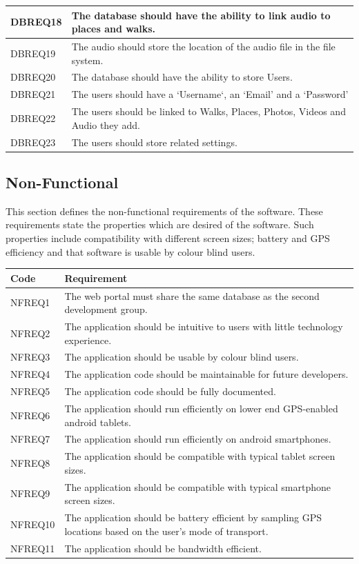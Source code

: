 \documentclass[11pt,a4paper]{article}
\begin{document}
\begin{longtable}{|p{2.5cm}p{13cm}|}
DBREQ18 & The database should have the ability to link audio to places and walks.\\ \hline
DBREQ19 & The audio should store the location of the audio file in the file system.\\ \hline
DBREQ20 & The database should have the ability to store Users. \\ \hline
DBREQ21 & The users should have a `Username`, an `Email' and a `Password'\\ \hline
DBREQ22 & The users should be linked to Walks, Places, Photos, Videos and Audio they add. \\ \hline
DBREQ23 & The users should store related settings. \\ \hline 

\end{longtable}

\subsection{Non-Functional}
\label{sec:non-func-reqs}

This section defines the non-functional requirements of the software.
These requirements state the properties which are desired of the software.
Such properties include compatibility with different screen sizes; battery and GPS efficiency and that software is usable by colour blind users.

\begin{longtable}{|p{2.5cm}p{13cm}|}
\hline
\textbf{Code} & \textbf{Requirement} \\

\hline
NFREQ1 & The web portal must share the same database as the second development group. \\ \hline
NFREQ2 & The application should be intuitive to users with little technology experience. \\ \hline
NFREQ3 & The application should be usable by colour blind users. \\ \hline
NFREQ4 & The application code should be maintainable for future developers. \\ \hline
NFREQ5 & The application code should be fully documented. \\ \hline
NFREQ6 & The application should run efficiently on lower end GPS-enabled android tablets. \\ \hline
NFREQ7 & The application should run efficiently on android smartphones. \\ \hline
NFREQ8 & The application should be compatible with typical tablet screen sizes. \\ \hline
NFREQ9 & The application should be compatible with typical smartphone screen sizes. \\ \hline
NFREQ10 & The application should be battery efficient by sampling GPS locations based on the user's mode of transport. \\ \hline
NFREQ11 & The application should be bandwidth efficient. \\ \hline
\end{longtable}
\end{document}
